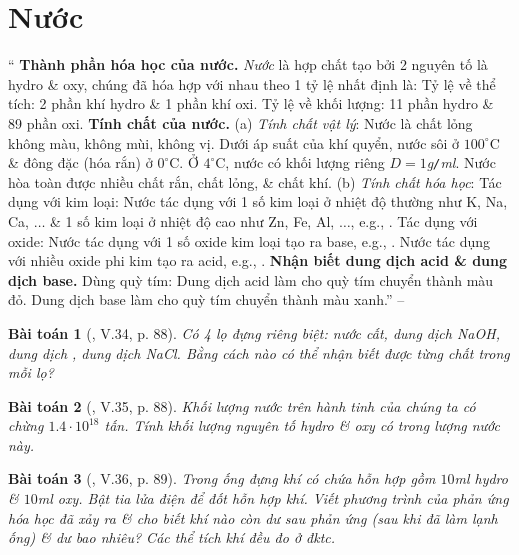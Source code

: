 \documentclass{article}
\newtheorem{baitoan}{Bài toán}
\begin{document}
\section{Nước}
`` \textbf{Thành phần hóa học của nước.} \textit{Nước} là hợp chất tạo bởi 2 nguyên tố là hydro \& oxy, chúng đã hóa hợp với nhau theo 1 tỷ lệ nhất định là: Tỷ lệ về thể tích: 2 phần khí hydro \& 1 phần khí oxi. Tỷ lệ về khối lượng: 11 phần hydro \& 89 phần oxi.  \textbf{Tính chất của nước.} (a) \textit{Tính chất vật lý}: Nước là chất lỏng không màu, không mùi, không vị. Dưới áp suất của khí quyển, nước sôi ở $100^\circ$C \& đông đặc (hóa rắn) ở $0^\circ$C. Ở $4^\circ$C, nước có khối lượng riêng $D = 1$\emph{g\texttt{/}ml}. Nước hòa toàn được nhiều chất rắn, chất lỏng, \& chất khí. (b) \textit{Tính chất hóa học}: Tác dụng với kim loại: Nước tác dụng với 1 số kim loại ở nhiệt độ thường như K, Na, Ca, $\ldots$ \& 1 số kim loại ở nhiệt độ cao như Zn, Fe, Al, $\ldots$, e.g., . Tác dụng với oxide: Nước tác dụng với 1 số oxide kim loại tạo ra base, e.g., . Nước tác dụng với nhiều oxide phi kim tạo ra acid, e.g., .  \textbf{Nhận biết dung dịch acid \& dung dịch base.} Dùng quỳ tím: Dung dịch acid làm cho quỳ tím chuyển thành màu đỏ. Dung dịch base làm cho quỳ tím chuyển thành màu xanh.'' -- \cite[Chap. 5, \S4, pp. 87--88]{Truong_BTNC_Hoa_Hoc_8_2022}

\begin{baitoan}[\cite{Truong_BTNC_Hoa_Hoc_8_2022}, V.34, p. 88]
	Có 4 lọ đựng riêng biệt: nước cất, dung dịch \emph{NaOH}, dung dịch \emph{}, dung dịch \emph{NaCl}. Bằng cách nào có thể nhận biết được từng chất trong mỗi lọ?
\end{baitoan}

\begin{baitoan}[\cite{Truong_BTNC_Hoa_Hoc_8_2022}, V.35, p. 88]
	Khối lượng nước trên hành tinh của chúng ta có chừng $1.4\cdot10^{18}$ tấn. Tính khối lượng nguyên tố hydro \& oxy có trong lượng nước này.
\end{baitoan}

\begin{baitoan}[\cite{Truong_BTNC_Hoa_Hoc_8_2022}, V.36, p. 89]
	Trong ống đựng khí có chứa hỗn hợp gồm $10$\emph{ml} hydro \& $10$\emph{ml} oxy. Bật tia lửa điện để đốt hỗn hợp khí. Viết phương trình của phản ứng hóa học đã xảy ra \& cho biết khí nào còn dư sau phản ứng (sau khi đã làm lạnh ống) \& dư bao nhiêu? Các thể tích khí đều đo ở đktc.
\end{baitoan}
\end{document}
